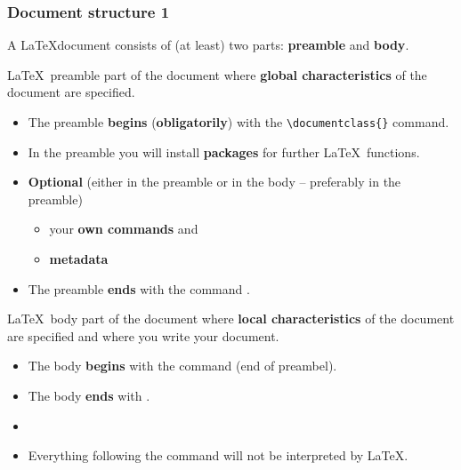 \begin{frame}[fragile]
\frametitle{Document structure 1}

A \LaTeX document consists of (at least) two parts: \textbf{preamble} and \textbf{body}.

\begin{block}{\LaTeX\ preamble}
	part of the document where \textbf{global characteristics} of the document are specified.
\end{block}

\pause 

	\begin{itemize}
		\item The preamble \textbf{begins} (\textbf{obligatorily}) with the \lstinline|\documentclass{}| command.
		
		\item In the preamble you will install \textbf{packages} for further \LaTeX\ functions.
		
		\item \textbf{Optional} (either in the preamble or in the body -- preferably in the preamble)

		\begin{itemize}
			\item your \textbf{own commands} and 
			
			\item \textbf{metadata} 
		\end{itemize}
		
		\item The preamble \textbf{ends} with the command  \lstinline||.
		
	\end{itemize}

\end{frame}


\begin{frame}[fragile]


\begin{block}{\LaTeX\ body}
	part of the document where \textbf{local characteristics} of the document are specified and where you write your document.
\end{block}

\pause 

\begin{itemize}
	
	\item The body \textbf{begins} with the \lstinline|| command  (end of preambel).
	
	\item The body \textbf{ends} with \lstinline||. 
	
	\item[]

\pause 
	
	\item Everything following the command \lstinline|| will not be interpreted by \LaTeX .
\end{itemize}

\end{frame}


